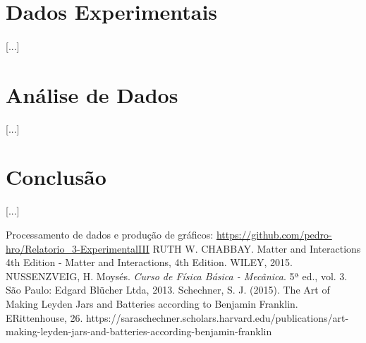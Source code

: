 \documentclass[column,brazilian,12pt,a4paper,final]{article}
\begin{document}
\section{Dados Experimentais}
\paragraph{}
[...]

\section{Análise de Dados}
[...]
\section{Conclusão}
[...]

\begin{thebibliography}{99}

\bibitem{}
Processamento de dados e produção de gráficos:
\url{https://github.com/pedro-hro/Relatorio_3-ExperimentalIII}
\bibitem{}
RUTH W. CHABBAY. Matter and Interactions 4th Edition - Matter and Interactions, 4th Edition. WILEY, 2015.
\bibitem{}
NUSSENZVEIG, H. Moysés. {\em Curso de Física Básica - Mecânica}. 5ª ed., vol. 3. São Paulo: Edgard Blücher Ltda, 2013.
\bibitem{}
Schechner, S. J. (2015). The Art of Making Leyden Jars and Batteries according to Benjamin Franklin. ERittenhouse, 26. https://saraschechner.scholars.harvard.edu/publications/art-making-leyden-jars-and-batteries-according-benjamin-franklin


\end{thebibliography}
\end{document}
